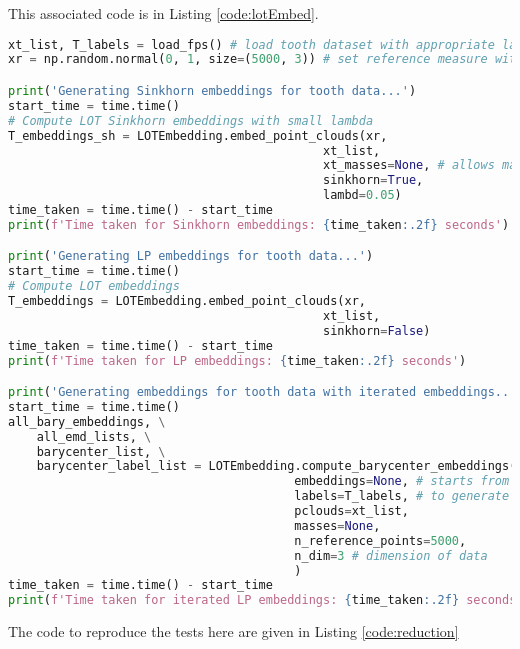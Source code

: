  This associated code is in Listing \ref{code:lotEmbed}.

\begin{lstlisting}[language=Python, caption=Code to embed tooth samples., label={code:lotEmbed}]
xt_list, T_labels = load_fps() # load tooth dataset with appropriate labels
xr = np.random.normal(0, 1, size=(5000, 3)) # set reference measure with 5000 points

print('Generating Sinkhorn embeddings for tooth data...')
start_time = time.time()
# Compute LOT Sinkhorn embeddings with small lambda
T_embeddings_sh = LOTEmbedding.embed_point_clouds(xr, 
                                            xt_list,
                                            xt_masses=None, # allows masses if needed.  Defaults to None (i.e. assume uniform mass)
                                            sinkhorn=True, 
                                            lambd=0.05)
time_taken = time.time() - start_time
print(f'Time taken for Sinkhorn embeddings: {time_taken:.2f} seconds')

print('Generating LP embeddings for tooth data...')
start_time = time.time()
# Compute LOT embeddings
T_embeddings = LOTEmbedding.embed_point_clouds(xr, 
                                            xt_list,
                                            sinkhorn=False)
time_taken = time.time() - start_time
print(f'Time taken for LP embeddings: {time_taken:.2f} seconds')

print('Generating embeddings for tooth data with iterated embeddings...')
start_time = time.time()
all_bary_embeddings, \
    all_emd_lists, \
    barycenter_list, \
    barycenter_label_list = LOTEmbedding.compute_barycenter_embeddings(n_iterations=3, 
                                        embeddings=None, # starts from Gaussian reference if None, else generates barycenter from embeddings 
                                        labels=T_labels, # to generate class-specific barycenters 
                                        pclouds=xt_list, 
                                        masses=None, 
                                        n_reference_points=5000,
                                        n_dim=3 # dimension of data
                                        )
time_taken = time.time() - start_time
print(f'Time taken for iterated LP embeddings: {time_taken:.2f} seconds')

\end{lstlisting}




 The code to reproduce the tests here are given in Listing \ref{code:reduction}

